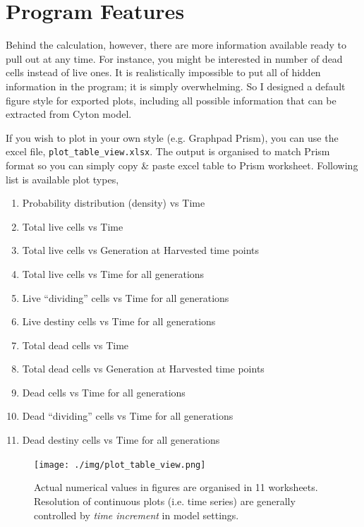 \documentclass{article}
\newcommand{\enterProblemHeader}[1]{
    }
\newcommand{\exitProblemHeader}[1]{
    }
\newcounter{homeworkProblemCounter} %
\newcommand{\homeworkProblemName}{}
\newenvironment{homeworkProblem}[1][Problem \arabic{homeworkProblemCounter}]{ %
    \stepcounter{homeworkProblemCounter} %
    \renewcommand{\homeworkProblemName}{#1} %
    \section{\homeworkProblemName} %
    \enterProblemHeader{\homeworkProblemName} %
    }{
    \exitProblemHeader{\homeworkProblemName} %
    }
\begin{document}
\begin{homeworkProblem}[Program Features]
        Behind the calculation, however, there are more information available ready to pull out at any time. For instance, you might be interested in number of dead cells instead of live ones. It is realistically impossible to put all of hidden information in the program; it is simply overwhelming. So I designed a default figure style for exported plots, including all possible information that can be extracted from Cyton model.

        If you wish to plot in your own style (e.g. Graphpad Prism), you can use the excel file, \verb+plot_table_view.xlsx+. The output is organised to match Prism format so you can simply copy \& paste excel table to Prism worksheet. Following list is available plot types,
        \begin{enumerate}
            \item Probability distribution (density) vs Time
            \item Total live cells vs Time
            \item Total live cells vs Generation at Harvested time points
            \item Total live cells vs Time for all generations
            \item Live ``dividing'' cells vs Time for all generations
            \item Live destiny cells vs Time for all generations
            \item Total dead cells vs Time
            \item Total dead cells vs Generation at Harvested time points
            \item Dead cells vs Time for all generations
            \item Dead ``dividing'' cells vs Time for all generations
            \item Dead destiny cells vs Time for all generations
        \end{enumerate}

        \begin{figure}[h]
            \centering
            \texttt{[image: ./img/plot\_table\_view.png]}
            \caption{Actual numerical values in figures are organised in 11 worksheets. Resolution of continuous plots (i.e. time series) are generally controlled by \textit{time increment} in model settings.}
            \label{fig:plot_table_view}
        \end{figure}


\end{homeworkProblem}
\end{document}
